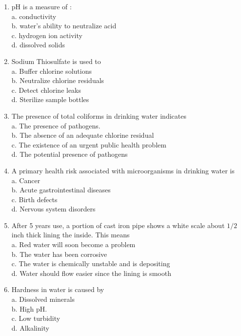 \documentclass{article}
\begin{document}
\begin{enumerate}[1.]
\item $\mathrm{pH}$ is a measure of :\\
a. conductivity\\
b. water's ability to neutralize acid\\
c. hydrogen ion activity\\
d. dissolved solids\\
\item  Sodium Thiosulfate is used to\\
a. Buffer chlorine solutions\\
b. Neutralize chlorine residuals\\
c. Detect chlorine leaks\\
d. Sterilize sample bottles\\
  \item The presence of total coliforms in drinking water indicates\\
a. The presence of pathogens.\\
b. The absence of an adequate chlorine residual\\
c. The existence of an urgent public health problem\\
d. The potential presence of pathogens\\
\item A primary health risk associated with microorganisms in drinking water is\\
a. Cancer\\
b. Acute gastrointestinal diseases\\
c. Birth defects\\
d. Nervous system disorders\\
  \item After 5 years use, a portion of cast iron pipe shows a white scale about $1 / 2$ inch thick lining the inside. This means\\
a. Red water will soon become a problem\\
b. The water has been corrosive\\
c. The water is chemically unstable and is depositing\\
d. Water should flow easier since the lining is smooth\\
  \item Hardness in water is caused by\\
a. Dissolved minerals\\
b. High $\mathrm{pH}$.\\
c. Low turbidity\\
d. Alkalinity\\

\end{enumerate}
\end{document}
